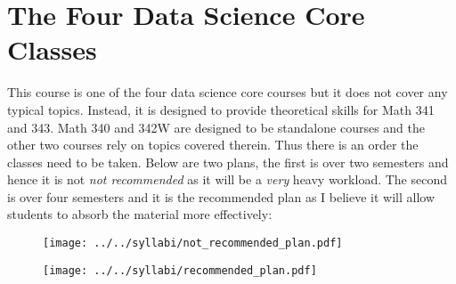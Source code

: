 \section*{The Four Data Science Core Classes}

This course is one of the four data science core courses but it does not cover any typical  topics. Instead, it is designed to provide theoretical skills for Math 341 and 343. Math 340 and 342W are designed to be standalone courses and the other two courses rely on topics covered therein. Thus there is an order the classes need to be taken. Below are two plans, the first is over two semesters and hence it is not \emph{not recommended} as it will be a \emph{very} heavy workload. The second is over four semesters and it is the recommended plan as I believe it will allow students to absorb the material more effectively:

\begin{figure}[htp]
\centering
\texttt{[image: ../../syllabi/not\_recommended\_plan.pdf]}
\label{fig:not_recommended}
\end{figure} 

\begin{figure}[htp]
\centering
\texttt{[image: ../../syllabi/recommended\_plan.pdf]}
\label{fig:recommended}
\end{figure} 